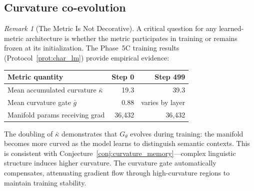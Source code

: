 \documentclass[11pt,a4paper]{article}
\theoremstyle{definition}
\theoremstyle{remark}
\newtheorem{remark}[theorem]{Remark}
\begin{document}
\subsection{Curvature co-evolution}\label{sec:curvature_coevol}

\begin{remark}[The Metric Is Not Decorative]%
\label{rem:metric_alive}
A critical question for any learned-metric architecture is 
whether the metric participates in training or remains frozen 
at its initialization. The Phase~5C training results 
(Protocol~\ref{prot:char_lm}) provide empirical evidence:

\begin{center}
\begin{tabular}{lrr}
\toprule
Metric quantity & Step 0 & Step 499 \\
\midrule
Mean accumulated curvature $\bar\kappa$ & 19.3 & 39.3 \\
Mean curvature gate $\bar{g}$ & 0.88 & varies by layer \\
Manifold params receiving grad & 36{,}432 & 36{,}432 \\
\bottomrule
\end{tabular}
\end{center}

The doubling of $\bar\kappa$ demonstrates that $G_\theta$ 
evolves during training: the manifold becomes more curved as 
the model learns to distinguish semantic contexts. This is 
consistent with Conjecture~\ref{conj:curvature_memory}---complex 
linguistic structure induces higher curvature. The curvature gate 
automatically compensates, attenuating gradient flow through 
high-curvature regions to maintain training stability.
\end{remark}
\end{document}
